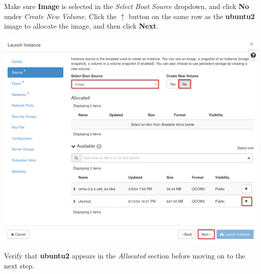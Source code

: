 \documentclass[letterpaper, 12pt]{article}
\begin{document}
\begin{enumerate}
    \begin{labstep}
        Make sure \textbf{Image} is selected in the \textit{Select Boot Source} dropdown, and click \textbf{No} under \textit{Create New Volume}.
        Click the $\uparrow$ button on the same row as the \textbf{ubuntu2} image to allocate the image, and then click \textbf{Next}.

        \begin{center}
            \includegraphics[width=\linewidth]{images/part4/step4.png}
        \end{center}
    \end{labstep}

    \begin{stopbox}
        Verify that \textbf{ubuntu2} appears in the \textit{Allocated} section before moving on to the next step.
    \end{stopbox}


\end{enumerate}
\end{document}
